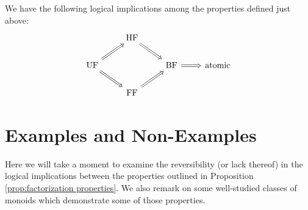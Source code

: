 \begin{prop} \label{prop:factorization properties}
We have the following logical implications among the properties defined just above:
\[\begin{tikzcd}[arrows = Rightarrow]
 & \text{HF} \arrow{dr}&  &  \\
\text{UF} \arrow{ur}\arrow{dr}  &  & \text{BF} \arrow{r}& \text{atomic} \\
 & \text{FF} \arrow{ur} &  & 
\end{tikzcd}\]
\end{prop}



\section{Examples and Non-Examples} \label{sec:examples}
Here we will take a moment to examine the reversibility (or lack thereof) in the logical implications between the properties outlined in Proposition \ref{prop:factorization properties}.
We also remark on some well-studied classes of monoids which demonstrate some of those properties.


